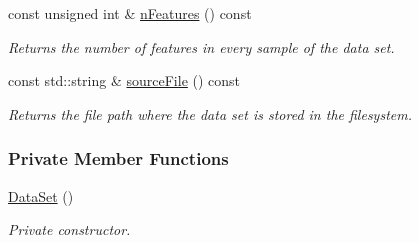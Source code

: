 \begin{CompactItemize}
const unsigned int \& \hyperlink{class_data_set_a4249f02ed870b2e76f0e73728229be2}{nFeatures} () const 
\begin{CompactList}\small\item\em Returns the number of features in every sample of the data set. \item\end{CompactList}\item 
const std::string \& \hyperlink{class_data_set_d7d233212f54f5c2764430b0cb1bea65}{sourceFile} () const 
\begin{CompactList}\small\item\em Returns the file path where the data set is stored in the filesystem. \item\end{CompactList}\end{CompactItemize}
\subsubsection*{Private Member Functions}
\begin{CompactItemize}
\item 
\hyperlink{class_data_set_c9b99505bafd5b1cccf8a361c3ac84a7}{DataSet} ()
\begin{CompactList}\small\item\em Private constructor. \item\end{CompactList}\end{CompactItemize}

